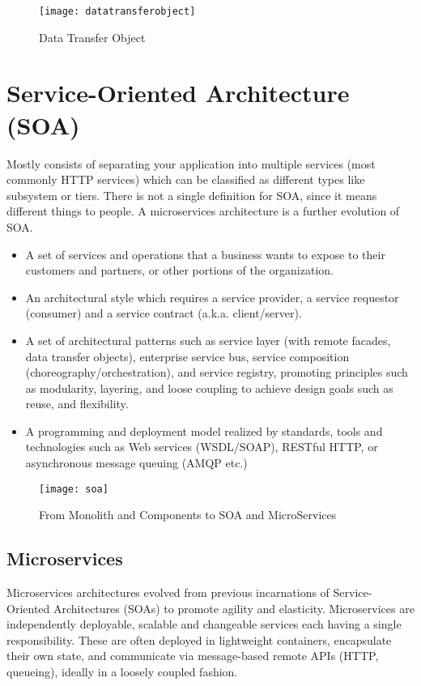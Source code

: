 \begin{figure}[H]
  \center
  \texttt{[image: datatransferobject]}
  \caption{Data Transfer Object}
\end{figure}

\section{Service-Oriented Architecture (SOA)}
Mostly consists of separating your application into multiple services (most commonly HTTP services) which can be classified as different types like subsystem or tiers. There is not a single definition for SOA, since it means different things to people. A microservices architecture is a further evolution of SOA.

\begin{itemize}
	\item A set of services and operations that a business wants to expose to their customers and partners, or other portions of the organization.
	\item An architectural style which requires a service provider, a service requestor (consumer) and a service contract (a.k.a. client/server).
	\item  A set of architectural patterns such as service layer (with remote facades, data transfer objects), enterprise service bus, service composition (choreography/orchestration), and service registry, promoting principles such as modularity, layering, and loose coupling to achieve design goals such as reuse, and flexibility.
	\item  A programming and deployment model realized by standards, tools and technologies such as Web services (WSDL/SOAP), RESTful HTTP, or asynchronous message queuing (AMQP etc.)
\end{itemize}

\begin{figure}[H]
  \center
  \texttt{[image: soa]}
  \caption{From Monolith and Components to SOA and MicroServices}
\end{figure}

\subsection{Microservices}
Microservices architectures evolved from previous incarnations of Service-Oriented Architectures (SOAs) to promote agility and elasticity. Microservices are independently deployable, scalable and changeable services each having a single responsibility. These are often deployed in lightweight containers, encapsulate their own state, and communicate via message-based remote APIs (HTTP, queueing), ideally in a loosely coupled fashion.

